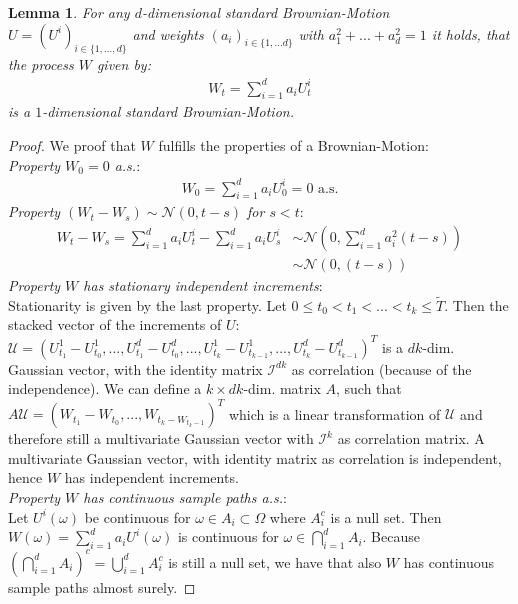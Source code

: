 \documentclass[12pt]{article}
\newtheorem{lemma}[theorem]{Lemma}
\begin{document}
	\begin{lemma}\label{lm:linearcombiofbmisbm}
		For any $d$-dimensional standard Brownian-Motion $U = (U^i)_{i\in\{1, ..., d\}}$ and weights $(a_i)_{i\in\{1,...d\}}$ with $a^2_1 + ... + a^2_d = 1$ it holds, that the process $W$ given by:
		\begin{align*}
			W_t = \sum_{i=1}^{d}a_iU^i_t
		\end{align*}
		is a $1$-dimensional standard Brownian-Motion.
	\end{lemma} 
	\begin{proof}
		We proof that $W$ fulfills the properties of a Brownian-Motion:\\
		\emph{Property $W_0=0$ a.s.}:
		\begin{align*}
			W_0 = \sum_{i=1}^{d}a_iU^i_0 = 0 \text{ a.s.}
		\end{align*}
		\emph{Property $(W_t-W_s) \sim \mathcal{N}(0, t-s)$ for $s < t$}:
		\begin{align*}
			W_t - W_s = \sum_{i=1}^{d}a_iU^i_t - \sum_{i=1}^{d}a_iU^i_s &\sim \mathcal{N}\left(0, \sum_{i=1}^{d}a^2_i(t-s)\right)\\
			&\sim \mathcal{N}\left(0, (t-s)\right)
		\end{align*}
		\emph{Property $W$ has stationary independent increments}:\\
		Stationarity is given by the last property. Let $0 \le t_0 < t_1 <...<t_k \le \tilde{T}$. Then the stacked vector of the increments of $U$: $\mathcal{U} = (U^1_{t_1} -U^1_{t_0}, ...,U^d_{t_1} -U^d_{t_0}, ..., U^1_{t_k} -U^1_{t_{k-1}}, ..., U^d_{t_k} -U^d_{t_{k-1}})^T$ is a $dk$-dim. Gaussian vector, with the identity matrix $\mathcal{I}^{dk}$ as correlation (because of the independence). We can define a $k \times dk$-dim. matrix $A$, such that $A\mathcal{U} = (W_{t_1}-W_{t_0}, ..., W_{t_k-W_{t_k-1}})^T$ which is a linear transformation of $\mathcal{U}$ and therefore still a multivariate Gaussian vector with $\mathcal{I}^{k}$ as correlation matrix. A multivariate Gaussian vector, with identity matrix as correlation is independent, hence $W$ has independent increments.
		\\
		\emph{Property $W$ has continuous sample paths a.s.}:\\
		Let $U^i(\omega)$ be continuous for $\omega \in A_i\subset\Omega$ where $A_i^c$ is a null set. Then $W(\omega) = \sum_{i=1}^{d}a_iU^i(\omega)$ is continuous for $\omega \in \bigcap_{i=1}^dA_i$. Because $\left(\bigcap_{i=1}^dA_i\right)^c = \bigcup_{i=1}^dA^c_i$ is still a null set, we have that also $W$ has continuous sample paths almost surely.
	\end{proof}
	
\end{document}
